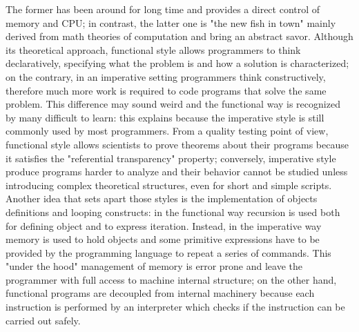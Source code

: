 The former has been around for long time and provides a direct control
of memory and CPU; in contrast, the latter one is "the new fish in
town" mainly derived from math theories of computation and bring an
abstract savor. Although its theoretical approach, functional style
allows programmers to think declaratively, specifying what the problem
is and how a solution is characterized; on the contrary, in an
imperative setting programmers think constructively, therefore much
more work is required to code programs that solve the same
problem. This difference may sound weird and the functional way is
recognized by many difficult to learn: this explains because the
imperative style is still commonly used by most programmers. From a
quality testing point of view, functional style allows scientists to
prove theorems about their programs because it satisfies the
"referential transparency" property; conversely, imperative style
produce programs harder to analyze and their behavior cannot be
studied unless introducing complex theoretical structures, even for
short and simple scripts.  Another idea that sets apart those styles
is the implementation of objects definitions and looping constructs:
in the functional way recursion is used both for defining object and
to express iteration. Instead, in the imperative way memory is used to
hold objects and some primitive expressions have to be provided by the
programming language to repeat a series of commands. This "under the
hood" management of memory is error prone and leave the programmer
with full access to machine internal structure; on the other hand,
functional programs are decoupled from internal machinery because each
instruction is performed by an interpreter which checks if the
instruction can be carried out safely.

